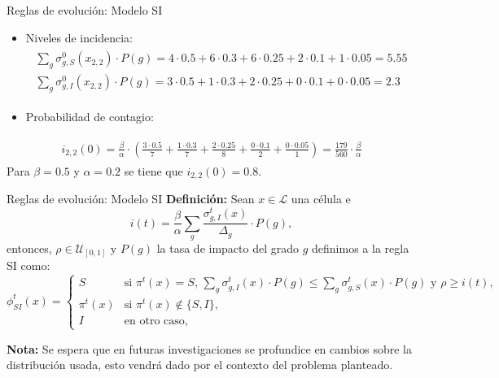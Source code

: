 \documentclass[9pt]{beamer}
\begin{document}
\begin{frame}{Reglas de evolución: Modelo SI}
\begin{itemize}
    \item Niveles de incidencia:
    \begin{align*}
    \begin{array}{l}
        \sum_g\sigma_{g,S}^0(x_{2,2})\cdot P(g) = 4\cdot0.5+6\cdot0.3+6\cdot0.25+2\cdot0.1+1\cdot0.05 = 5.55 \\
        \sum_g\sigma_{g,I}^0(x_{2,2})\cdot P(g) = 3\cdot0.5+1\cdot0.3+2\cdot0.25+0\cdot0.1+0\cdot0.05 = 2.3
    \end{array}
\end{align*}
\item Probabilidad de contagio: 
\end{itemize}
\begin{align*}
    \begin{array}{l}
        i_{2,2}(0) = \frac{\beta}{\alpha}\cdot\left(\frac{3\cdot0.5}{7}+\frac{1\cdot0.3}{7}+\frac{2\cdot0.25}{8}+\frac{0\cdot0.1}{2}+\frac{0\cdot0.05}{1}\right)=\frac{179}{560}\cdot\frac{\beta}{\alpha}
    \end{array}
\end{align*}
Para $\beta=0.5$ y $\alpha=0.2$ se tiene que $i_{2,2}(0)=0.8$.
\end{frame}

\begin{frame}{Reglas de evolución: Modelo SI}
\textbf{Definición:} Sean $x\in\mathcal{L}$ una célula e
\begin{equation}
    i(t) = \frac{\beta}{\alpha}\sum_g{\frac{\sigma_{g,I}^t(x)}{\Delta_g}}\cdot P(g),
\end{equation}
entonces, $\rho\in\mathcal{U}_{[0,1]}$ y $P(g)$ la tasa de impacto del grado $g$ definimos a la regla SI como:
\begin{equation}
    \phi_{SI}^t(x)=\left\{\begin{array}{ll}
        S & \text{si }\pi^t(x)=S\text{, }\sum_g{\sigma_{g,I}^t(x)\cdot P(g)}\leq \sum_g{\sigma_{g,S}^t(x)\cdot P(g)}\text{ y }\rho\geq i(t),\\
        \pi^t(x) & \text{si }\pi^t(x)\notin\{S,I\}\text{,} \\
        I & \text{en otro caso,}
    \end{array}\right.
\end{equation}

\textbf{Nota:} Se espera que en futuras investigaciones se profundice en cambios sobre la distribución usada, esto vendrá dado por el contexto del problema planteado.
\end{frame}
\end{document}
